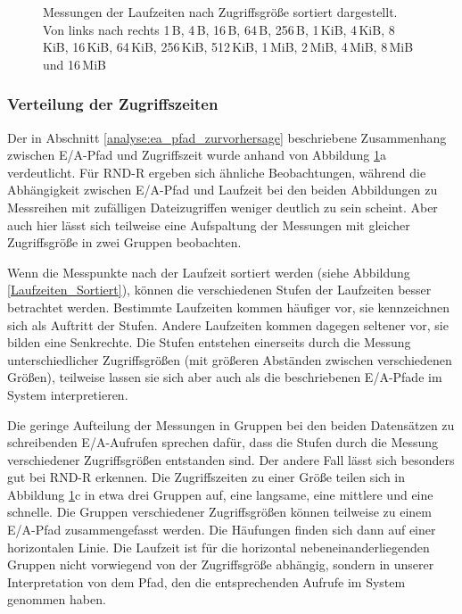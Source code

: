 \documentclass[
	12pt,
	a4paper,
	BCOR10mm,
	DIV14,
	listof=totoc,
	bibliography=totoc,
	headsepline
]{scrreprt}
\begin{document}
\begin{figure}
{	}	
	\caption{Messungen der Laufzeiten nach Zugriffsgröße sortiert dargestellt. Von links nach rechts 1\,B, 4\,B, 16\,B, 64\,B, 256\,B, 1\,KiB, 4\,KiB, 8\,KiB, 16\,KiB, 64\,KiB, 256\,KiB, 512\,KiB, 1\,MiB, 2\,MiB, 4\,MiB, 8\,MiB und 16\,MiB}
	\label{Laufzeiten_Zeitreihe}
\end{figure} 

\subsubsection{Verteilung der Zugriffszeiten}
Der in Abschnitt \ref{analyse:ea_pfad_zurvorhersage} beschriebene Zusammenhang zwischen E/A-Pfad und Zugriffszeit wurde anhand von Abbildung \ref{Laufzeiten_Zeitreihe}a verdeutlicht.
Für RND-R ergeben sich ähnliche Beobachtungen, während die Abhängigkeit zwischen E/A-Pfad und Laufzeit bei den beiden Abbildungen zu Messreihen mit zufälligen Dateizugriffen weniger deutlich zu sein scheint. Aber auch hier lässt sich teilweise eine Aufspaltung der Messungen mit gleicher Zugriffsgröße in zwei Gruppen beobachten.\medskip

Wenn die Messpunkte nach der Laufzeit sortiert werden (siehe Abbildung \ref{Laufzeiten_Sortiert}), können die verschiedenen Stufen der Laufzeiten besser betrachtet werden.
Bestimmte Laufzeiten kommen häufiger vor, sie kennzeichnen sich als Auftritt der Stufen. Andere Laufzeiten kommen dagegen seltener vor, sie bilden eine Senkrechte.
Die Stufen entstehen einerseits durch die Messung unterschiedlicher Zugriffsgrößen (mit größeren Abständen zwischen verschiedenen Größen), teilweise lassen sie sich aber auch als die beschriebenen E/A-Pfade im System interpretieren.\medskip

Die geringe Aufteilung der Messungen in Gruppen bei den beiden Datensätzen zu schreibenden E/A-Aufrufen sprechen dafür, dass die Stufen durch die Messung verschiedener Zugriffsgrößen entstanden sind.
Der andere Fall lässt sich besonders gut bei RND-R erkennen. Die Zugriffszeiten zu einer Größe teilen sich in Abbildung \ref{Laufzeiten_Zeitreihe}c in etwa drei Gruppen auf, eine langsame, eine mittlere und eine schnelle.
Die Gruppen verschiedener Zugriffsgrößen können teilweise zu einem E/A-Pfad zusammengefasst werden. Die Häufungen finden sich dann auf einer horizontalen Linie. 
Die Laufzeit ist für die horizontal nebeneinanderliegenden Gruppen nicht vorwiegend von der Zugriffsgröße abhängig, sondern in unserer Interpretation von dem Pfad, den die entsprechenden Aufrufe im System genommen haben. 
\end{document}
